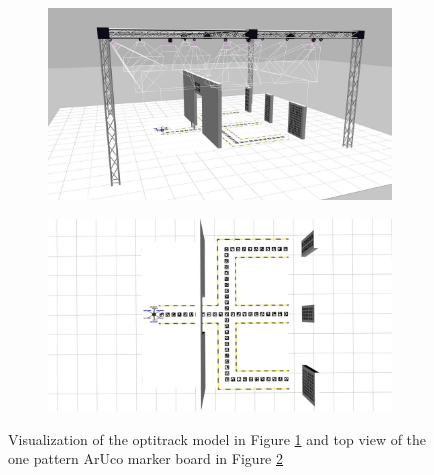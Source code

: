 \documentclass[../Head/report.tex]{subfiles}
\begin{document}
\begin{figure}[H]
    \centering
    \begin{subfigure}[t]{.48\textwidth}
        \centering
        \includegraphics[width=\textwidth]{../Figures/3d-modeling/gazebo_one_pattern_view.jpg}
        \caption{}
        \label{fig:optitrack_one_pattern_aruco}
    \end{subfigure}
    \hfill
    \begin{subfigure}[t]{.48\textwidth}
        \centering
        \includegraphics[width=\textwidth]{../Figures/3d-modeling/gazebo_one_pattern.jpg}
        \caption{}
        \label{fig:one_pattern_aruco}
    \end{subfigure}
    \caption{Visualization of the optitrack model in Figure \ref{fig:optitrack_one_pattern_aruco} and top view of the one pattern ArUco marker board in Figure \ref{fig:one_pattern_aruco}}
    \label{fig:one_pattern_aruco_fig}
\end{figure}
\end{document}
